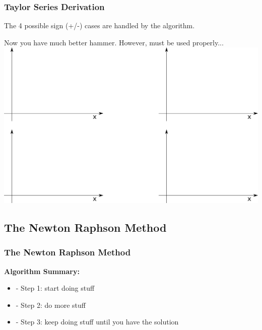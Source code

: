 \documentclass[fleqn]{beamer} %
\newcommand{\sectionIIsubsectionIItitle}{Taylor Series Derivation}
\newcommand{\sectionIIsubsectionIIItitle}{The Newton Raphson Method}
\begin{document}
			\begin{frame}
				\frametitle{\sectionIIsubsectionIItitle} \small
				\bigskip

				The 4 possible sign (+/-) cases are handled by the algorithm. 

				Now you have much better hammer. However, must be used properly... \vspace{3mm}\\
				\includegraphics[scale=.35]{images/topic3_fig2.png}

				\btVFill
			\end{frame}		


		\subsection{\sectionIIsubsectionIIItitle}\label{sectionIIsubsectionIII}

			\begin{frame}
				\frametitle{\sectionIIsubsectionIIItitle}
				\bigskip

				\textbf{Algorithm Summary:}
				\begin{itemize}
					\item - Step 1: start doing stuff 
					\item - Step 2: do more stuff
					\item - Step 3: keep doing stuff until you have the solution
				\end{itemize}
				\btVFill 
			\end{frame}
\end{document}
